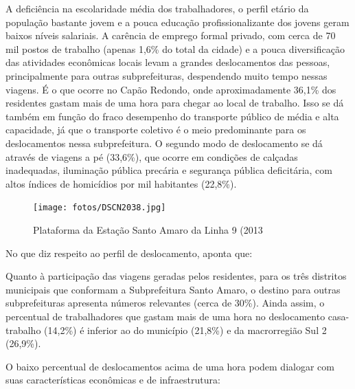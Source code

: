 	\begin{citacao}
		A deficiência na escolaridade média dos trabalhadores, o perfil etário da população bastante jovem e a pouca educação profissionalizante dos jovens geram baixos níveis salariais. A carência de emprego formal privado, com cerca de 70 mil postos de trabalho (apenas 1,6\% do total da cidade) e a pouca diversificação das atividades econômicas locais levam a grandes deslocamentos das pessoas, principalmente para outras subprefeituras, despendendo muito tempo nessas viagens. É o que ocorre no Capão Redondo, onde aproximadamente 36,1\% dos residentes gastam mais de uma hora para chegar ao local de trabalho. Isso se dá também em função do fraco desempenho do transporte público de média e alta capacidade, já que o transporte coletivo é o meio predominante para os deslocamentos nessa subprefeitura. O segundo modo de deslocamento se dá através de viagens a pé (33,6\%), que ocorre em condições de calçadas inadequadas, iluminação pública precária e segurança pública deficitária, com altos índices de homicídios por mil habitantes (22,8\%).
	\end{citacao}
	
	\begin{figure}[h]
		\caption{Plataforma da Estação Santo Amaro da Linha 9 (2013}
		\texttt{[image: fotos/DSCN2038.jpg]}
	\end{figure}	
	
	No que diz respeito ao perfil de deslocamento,  aponta que:
	
	\begin{citacao}
		Quanto à participação das viagens geradas pelos residentes, para os três distritos municipais que conformam a Subprefeitura Santo Amaro, o destino para outras subprefeituras apresenta números relevantes (cerca de 30\%). Ainda assim, o percentual de trabalhadores que gastam mais de uma hora no deslocamento casa-trabalho (14,2\%) é inferior ao do município (21,8\%) e da macrorregião Sul 2 (26,9\%).
	\end{citacao}
	
	O baixo percentual de deslocamentos acima de uma hora podem dialogar com suas características econômicas e de infraestrutura:
	
